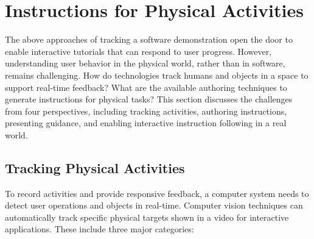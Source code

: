 \section{Instructions for Physical Activities}
\label{related_physical}

The above approaches of tracking a software demonstration open the door to enable interactive tutorials that can respond to user progress. However, understanding user behavior in the physical world, rather than in software, remains challenging.
%
How do technologies track humans and objects in a space to support real-time feedback? What are the available authoring techniques to generate instructions for physical tasks?
%
This section discusses the challenges from four perspectives, including tracking activities, authoring instructions, presenting guidance, and enabling interactive instruction following in a real world.


\subsection{Tracking Physical Activities}
To record activities and provide responsive feedback, a computer system needs to detect user operations and objects in real-time.
%
Computer vision techniques can automatically track specific physical targets shown in a video for interactive applications. These include three major categories:

